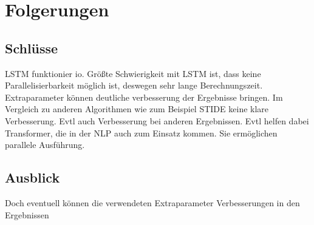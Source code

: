 \chapter{Folgerungen}\label{ch:folgerungen}
\section{Schlüsse}

LSTM funktionier io.
Größte Schwierigkeit mit LSTM ist, dass keine Parallelisierbarkeit möglich ist, deswegen sehr lange Berechnungszeit.
Extraparameter können deutliche verbesserung der Ergebnisse bringen.
Im Vergleich zu anderen Algorithmen wie zum Beispiel \ac{STIDE} keine klare Verbesserung. 
Evtl auch Verbesserung bei anderen Ergebnissen.
Evtl helfen dabei Transformer, die in der NLP auch zum Einsatz kommen.
Sie ermöglichen parallele Ausführung.

\section{Ausblick}

Doch eventuell können die verwendeten Extraparameter Verbesserungen in den Ergebnissen  

